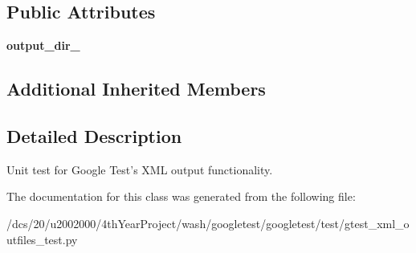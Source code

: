 \subsection*{Public Attributes}
\begin{DoxyCompactItemize}
\item 
\mbox{\label{classgtest__xml__outfiles__test_1_1GTestXMLOutFilesTest_aa5c31cd97047bc1d3060f4d27bc956a4}} 
{\bfseries output\+\_\+dir\+\_\+}
\end{DoxyCompactItemize}
\subsection*{Additional Inherited Members}


\subsection{Detailed Description}
\begin{DoxyVerb}Unit test for Google Test's XML output functionality.\end{DoxyVerb}
 

The documentation for this class was generated from the following file\+:\begin{DoxyCompactItemize}
\item 
/dcs/20/u2002000/4th\+Year\+Project/wash/googletest/googletest/test/gtest\+\_\+xml\+\_\+outfiles\+\_\+test.\+py\end{DoxyCompactItemize}
